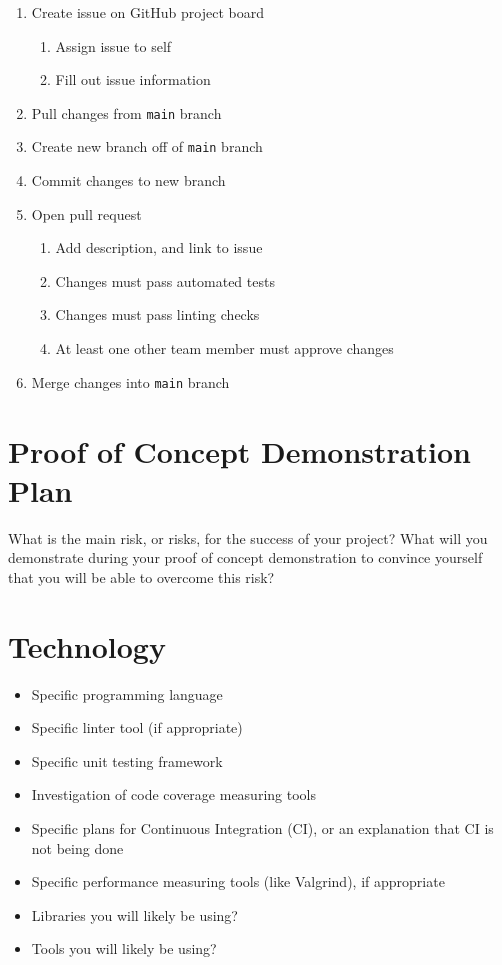 \documentclass{article}
\begin{document}
\begin{enumerate}
	\item Create issue on GitHub project board
	\begin{enumerate}
		\item Assign issue to self
		\item Fill out issue information
	\end{enumerate}
	\item Pull changes from \texttt{main} branch
	\item Create new branch off of \texttt{main} branch
	\item Commit changes to new branch
	\item Open pull request
	\begin{enumerate}
		\item Add description, and link to issue
		\item Changes must pass automated tests
		\item Changes must pass linting checks
		\item At least one other team member must approve changes
	\end{enumerate}
	\item Merge changes into \texttt{main} branch
	
\end{enumerate}
\section{Proof of Concept Demonstration Plan}

What is the main risk, or risks, for the success of your project?  What will you
demonstrate during your proof of concept demonstration to convince yourself that
you will be able to overcome this risk?

\section{Technology}

\begin{itemize}
\item Specific programming language
\item Specific linter tool (if appropriate)
\item Specific unit testing framework
\item Investigation of code coverage measuring tools
\item Specific plans for Continuous Integration (CI), or an explanation that CI
  is not being done
\item Specific performance measuring tools (like Valgrind), if
  appropriate
\item Libraries you will likely be using?
\item Tools you will likely be using?
\end{itemize}
\end{document}
